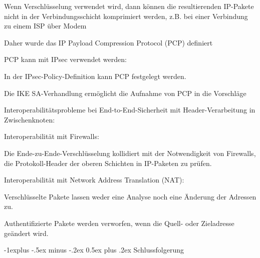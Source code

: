 \documentclass[a4paper]{article}
\makeatletter
\renewcommand{\subsection}{\@startsection{subsection}{2}{0mm}%
 {-1explus -.5ex minus -.2ex}%
 {0.5ex plus .2ex}%
 {\normalfont\normalsize\bfseries}}
\makeatother
\begin{document}
\begin{multicols}{3}
\begin{itemize*}
\begin{itemize*}
                  \begin{itemize*}
                        \item Wenn Verschlüsselung verwendet wird, dann können die resultierenden IP-Pakete nicht in der Verbindungsschicht komprimiert werden, z.B. bei einer Verbindung zu einem ISP über Modem
                        \item Daher wurde das IP Payload Compression Protocol (PCP) definiert
                        \item PCP kann mit IPsec verwendet werden:
                        \begin{itemize*} \item In der IPsec-Policy-Definition kann PCP festgelegt werden. \item Die IKE SA-Verhandlung ermöglicht die Aufnahme von PCP in die Vorschläge \end{itemize*}
                  \end{itemize*}
                  \item
                  Interoperabilitätsprobleme bei End-to-End-Sicherheit mit
                  Header-Verarbeitung in Zwischenknoten:

                  \begin{itemize*}
                        \item Interoperabilität mit Firewalls:
                        \begin{itemize*} \item Die Ende-zu-Ende-Verschlüsselung kollidiert mit der Notwendigkeit von Firewalls, die Protokoll-Header der oberen Schichten in IP-Paketen zu prüfen. \end{itemize*}
                        \item Interoperabilität mit Network Address Translation (NAT):
                        \begin{itemize*} \item Verschlüsselte Pakete lassen weder eine Analyse noch eine Änderung der Adressen zu. \item Authentifizierte Pakete werden verworfen, wenn die Quell- oder Zieladresse geändert wird. \end{itemize*}
                  \end{itemize*}
            \end{itemize*}


            \subsection{Schlussfolgerung}


\end{itemize*}
\end{multicols}
\end{document}
